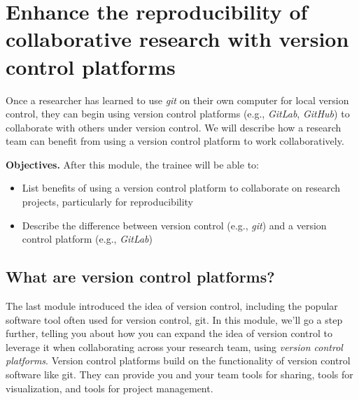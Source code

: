 \documentclass[]{tufte-book}
\providecommand{\tightlist}{%
  \setlength{\itemsep}{0pt}\setlength{\parskip}{0pt}}
\begin{document}
\section{Enhance the reproducibility of collaborative research with version control platforms}\label{module10}

Once a researcher has learned to use \emph{git} on their own computer for
local version control, they can begin using version control platforms (e.g.,
\emph{GitLab}, \emph{GitHub}) to collaborate with others under version
control. We will describe how a research team can benefit from using a version
control platform to work collaboratively.

\textbf{Objectives.} After this module, the trainee will be able to:

\begin{itemize}
\tightlist
\item
  List benefits of using a version control platform to collaborate
  on research projects, particularly for reproducibility
\item
  Describe the difference between version control (e.g., \emph{git}) and
  a version control platform (e.g., \emph{GitLab})
\end{itemize}

\subsection{What are version control platforms?}\label{what-are-version-control-platforms}

The last module introduced the idea of version control, including the popular
software tool often used for version control, git. In this module, we'll go a
step further, telling you about how you can expand the idea of version control
to leverage it when collaborating across your research team, using \emph{version
control platforms}. Version control platforms build on the functionality of
version control software like git. They can provide you and your team tools
for sharing, tools for visualization, and tools for project management.
\end{document}
